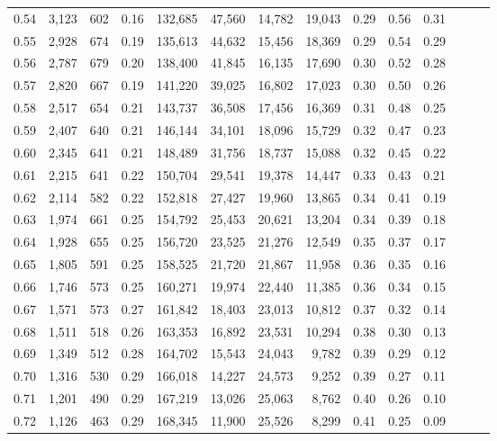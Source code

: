 \begin{tabular}{rrrrrrrrrrrrrr}
0.54 &  3,123 &  602 &  0.16 &  132,685 &   47,560 &  14,782 &  19,043 &  0.29 &  0.56 &      0.31 \\
0.55 &  2,928 &  674 &  0.19 &  135,613 &   44,632 &  15,456 &  18,369 &  0.29 &  0.54 &      0.29 \\
0.56 &  2,787 &  679 &  0.20 &  138,400 &   41,845 &  16,135 &  17,690 &  0.30 &  0.52 &      0.28 \\
0.57 &  2,820 &  667 &  0.19 &  141,220 &   39,025 &  16,802 &  17,023 &  0.30 &  0.50 &      0.26 \\
0.58 &  2,517 &  654 &  0.21 &  143,737 &   36,508 &  17,456 &  16,369 &  0.31 &  0.48 &      0.25 \\
0.59 &  2,407 &  640 &  0.21 &  146,144 &   34,101 &  18,096 &  15,729 &  0.32 &  0.47 &      0.23 \\
0.60 &  2,345 &  641 &  0.21 &  148,489 &   31,756 &  18,737 &  15,088 &  0.32 &  0.45 &      0.22 \\
0.61 &  2,215 &  641 &  0.22 &  150,704 &   29,541 &  19,378 &  14,447 &  0.33 &  0.43 &      0.21 \\
0.62 &  2,114 &  582 &  0.22 &  152,818 &   27,427 &  19,960 &  13,865 &  0.34 &  0.41 &      0.19 \\
0.63 &  1,974 &  661 &  0.25 &  154,792 &   25,453 &  20,621 &  13,204 &  0.34 &  0.39 &      0.18 \\
0.64 &  1,928 &  655 &  0.25 &  156,720 &   23,525 &  21,276 &  12,549 &  0.35 &  0.37 &      0.17 \\
0.65 &  1,805 &  591 &  0.25 &  158,525 &   21,720 &  21,867 &  11,958 &  0.36 &  0.35 &      0.16 \\
0.66 &  1,746 &  573 &  0.25 &  160,271 &   19,974 &  22,440 &  11,385 &  0.36 &  0.34 &      0.15 \\
0.67 &  1,571 &  573 &  0.27 &  161,842 &   18,403 &  23,013 &  10,812 &  0.37 &  0.32 &      0.14 \\
0.68 &  1,511 &  518 &  0.26 &  163,353 &   16,892 &  23,531 &  10,294 &  0.38 &  0.30 &      0.13 \\
0.69 &  1,349 &  512 &  0.28 &  164,702 &   15,543 &  24,043 &   9,782 &  0.39 &  0.29 &      0.12 \\
0.70 &  1,316 &  530 &  0.29 &  166,018 &   14,227 &  24,573 &   9,252 &  0.39 &  0.27 &      0.11 \\
0.71 &  1,201 &  490 &  0.29 &  167,219 &   13,026 &  25,063 &   8,762 &  0.40 &  0.26 &      0.10 \\
0.72 &  1,126 &  463 &  0.29 &  168,345 &   11,900 &  25,526 &   8,299 &  0.41 &  0.25 &      0.09 \\

\end{tabular}
